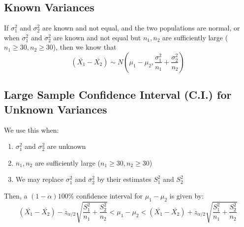 \subsection{Known Variances}
If $\sigma_1^2$ and $\sigma_2^2$ are known and not equal, and the two populations are normal, or when $\sigma_1^2$ and $\sigma_2^2$ are known and not equal but $n_1, n_2$ are sufficiently large ($n_1 \geq 30, n_2 \geq 30$), then we know that
$$
(\bar{X_1} - \bar{X_2}) \sim N\left (\mu_1 - \mu_2, \dfrac{\sigma_1^2}{n_1} + \dfrac{\sigma_2^2}{n_2}\right)
$$
\subsection{Large Sample Confidence Interval (C.I.) for Unknown Variances}
We use this when:
\begin{enumerate}
    \item $\sigma_1^2$ and $\sigma_2^2$ are unknown
    \item $n_1, n_2$ are sufficiently large ($n_1 \geq 30, n_2 \geq 30$)
    \item We may replace $\sigma_1^2$ and $\sigma_2^2$ by their estimates $S_1^2$ and $S_2^2$
\end{enumerate}
Then, a $(1-\alpha)100\%$ confidence interval for $\mu_1 - \mu_2$ is given by:
$$
(\bar{X_1} - \bar{X_2}) - z_{\alpha/2} \sqrt{\dfrac{S_1^2}{n_1} + \dfrac{S_2^2}{n_2}} < \mu_1 - \mu_2 < (\bar{X_1} - \bar{X_2}) + z_{\alpha/2} \sqrt{\dfrac{S_1^2}{n_1} + \dfrac{S_2^2}{n_2}}
$$

